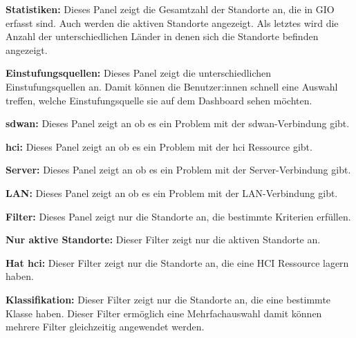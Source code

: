 \begin{compactitem}
    \item \textbf{Statistiken:} Dieses Panel zeigt die Gesamtzahl der Standorte an, die in GIO erfasst sind. 
    Auch werden die aktiven Standorte angezeigt. 
    Als letztes wird die Anzahl der unterschiedlichen Länder in denen sich die Standorte befinden angezeigt.
    \item \textbf{Einstufungsquellen:} Dieses Panel zeigt die unterschiedlichen Einstufungsquellen an.
    Damit können die Benutzer:innen schnell eine Auswahl treffen, welche Einstufungsquelle sie auf dem Dashboard sehen möchten.

    \begin{compactitem}
        \item \textbf{\gls{sdwan}:} Dieses Panel zeigt an ob es ein Problem mit der \gls{sdwan}-Verbindung gibt.
        \item \textbf{\gls{hci}:} Dieses Panel zeigt an ob es ein Problem mit der \gls{hci} Ressource gibt.
        \item \textbf{Server:} Dieses Panel zeigt an ob es ein Problem mit der Server-Verbindung gibt.
        \item \textbf{LAN:} Dieses Panel zeigt an ob es ein Problem mit der LAN-Verbindung gibt.
    \end{compactitem}

    \item \textbf{Filter:} Dieses Panel zeigt nur die Standorte an, die bestimmte Kriterien erfüllen.
    
    \begin{compactitem}
        \item \textbf{Nur aktive Standorte:} Dieser Filter zeigt nur die aktiven Standorte an.
        \item \textbf{Hat \gls{hci}:} Dieser Filter zeigt nur die Standorte an, die eine HCI Ressource lagern haben.
        \item \textbf{Klassifikation:} Dieser Filter zeigt nur die Standorte an, die eine bestimmte Klasse haben. 
        Dieser Filter ermöglich eine Mehrfachauswahl damit können mehrere Filter gleichzeitig angewendet werden.
        

\end{compactitem}
\end{compactitem}
